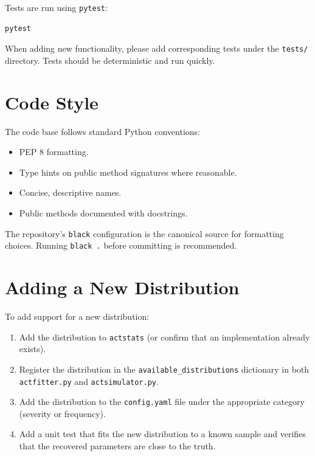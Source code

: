 Tests are run using \texttt{pytest}:

\begin{lstlisting}[style=bashstyle]
pytest
\end{lstlisting}

When adding new functionality, please add corresponding tests under the
\texttt{tests/} directory. Tests should be deterministic and run
quickly.

\section{Code Style}

The code base follows standard Python conventions:

\begin{itemize}[leftmargin=*]
    \item PEP 8 formatting.
    \item Type hints on public method signatures where reasonable.
    \item Concise, descriptive names.
    \item Public methods documented with docstrings.
\end{itemize}

The repository's \texttt{black} configuration is the canonical source
for formatting choices. Running \texttt{black .} before committing is
recommended.

\section{Adding a New Distribution}

To add support for a new distribution:

\begin{enumerate}[leftmargin=*]
    \item Add the distribution to \texttt{actstats} (or confirm that an
          implementation already exists).
    \item Register the distribution in the
          \texttt{available\_distributions} dictionary in both
          \texttt{actfitter.py} and \texttt{actsimulator.py}.
    \item Add the distribution to the \texttt{config.yaml} file under
          the appropriate category (severity or frequency).
    \item Add a unit test that fits the new distribution to a known
          sample and verifies that the recovered parameters are close
          to the truth.
\end{enumerate}


